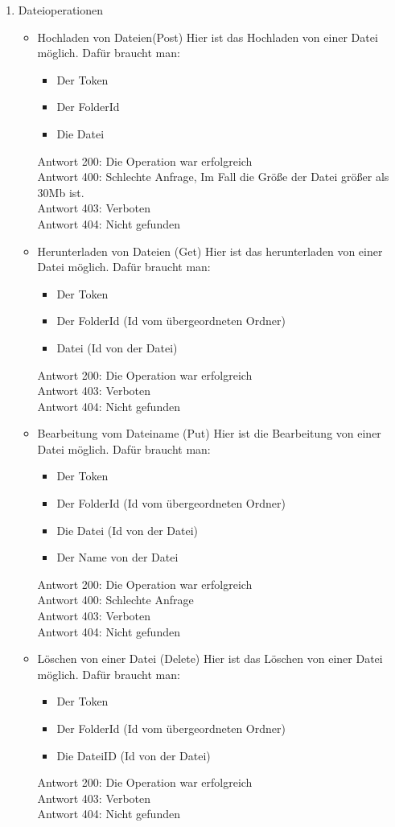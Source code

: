 \begin{enumerate}
\item Dateioperationen
\begin{itemize}
\item Hochladen von Dateien(Post)
Hier ist das Hochladen von einer Datei m\"oglich. Daf\"ur braucht man: 
\begin{itemize}
\item Der Token
\item Der FolderId 
\item Die Datei
\end{itemize}
Antwort 200: Die Operation war erfolgreich \\ 
Antwort 400: Schlechte Anfrage, Im Fall die Gr\"o{\ss}e der Datei gr\"o{\ss}er als 30Mb ist. \\
Antwort 403: Verboten \\
Antwort 404: Nicht gefunden
\item Herunterladen von Dateien (Get)
Hier ist das herunterladen von einer Datei m\"oglich. Daf\"ur braucht man:
\begin{itemize}
\item Der Token
\item Der FolderId (Id vom \"ubergeordneten Ordner)
\item Datei (Id von der Datei)
\end{itemize}
Antwort 200: Die Operation war erfolgreich \\ 
Antwort 403: Verboten \\
Antwort 404: Nicht gefunden
\item Bearbeitung vom Dateiname (Put)
Hier ist die Bearbeitung von einer Datei m\"oglich. Daf\"ur braucht man:
\begin{itemize}
\item Der Token
\item Der FolderId (Id vom \"ubergeordneten Ordner)
\item Die Datei (Id von der Datei)
\item Der Name von der Datei 
\end{itemize}

Antwort 200: Die Operation war erfolgreich \\ 
Antwort 400: Schlechte Anfrage \\
Antwort 403: Verboten \\
Antwort 404: Nicht gefunden
\item Löschen von einer Datei (Delete)
Hier ist das L\"oschen von einer Datei m\"oglich. Daf\"ur braucht man: 
\begin{itemize}
\item Der Token
\item Der FolderId (Id vom \"ubergeordneten Ordner)
\item Die DateiID (Id von der Datei)
\end{itemize}
Antwort 200: Die Operation war erfolgreich \\ 
Antwort 403: Verboten \\
Antwort 404: Nicht gefunden
\end{itemize}


\end{enumerate}

